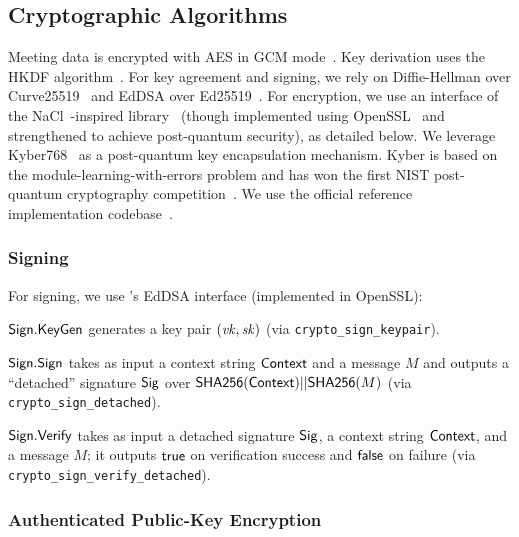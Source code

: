 \subsection{Cryptographic Algorithms}\label{subsec:cryptoalgs}

Meeting data is encrypted with AES in GCM mode~\cite{sp80038d}.
%
Key derivation uses the HKDF algorithm~\cite{rfc5869}.
%
For key agreement and signing, we rely on Diffie-Hellman over
Curve25519~\cite{bernstein2006curve25519} and EdDSA over Ed25519~\cite{eddsa}.
%
For encryption, we use an interface of the NaCl~\cite{nacl}-inspired \sodium{}
library~\cite{libsodium} (though implemented using OpenSSL~\cite{openssl} and strengthened to
achieve post-quantum security), as detailed below.
%
We leverage Kyber768~\cite{kyber} as a post-quantum key encapsulation mechanism. Kyber is based on
the module-learning-with-errors problem and has won the first NIST post-quantum cryptography
competition~\cite{nistpqc}. We use the official reference implementation codebase~\cite{kybercode}.

\subsubsection{Signing}

For signing, we use \sodium 's EdDSA interface (implemented in OpenSSL):
%
\begin{itemize*}
   \item ${\sf Sign}.\mathsf{KeyGen}$ generates a key pair $(\mathit{vk}, \mathit{sk})$ (via
   \texttt{crypto\_sign\_keypair}).
   \item ${\sf Sign}.\mathsf{Sign}$ takes as input a context string ${\sf Context}$ and a message $M$ and outputs a
   ``detached'' signature ${\sf Sig}$ over ${\sf SHA256}({\sf Context}) || {\sf SHA256}(M)$ (via
   \texttt{crypto\_sign\_detached}).
   \item ${\sf Sign}.\mathsf{Verify}$ takes as input a detached signature ${\sf Sig}$, a context
   string ${\sf Context}$, and a message $M$; it outputs $\mathsf{true}$ on verification success and $\mathsf{false}$ on
   failure (via \texttt{crypto\_\-sign\_\-verify\_\-detached}).
\end{itemize*}

\subsubsection{Authenticated Public-Key Encryption}\label{subsubsec:meetingcrypto}

